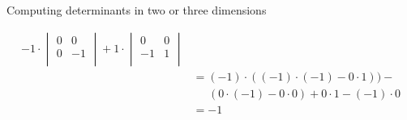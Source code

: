 \documentclass[notes]{beamer}
\begin{document}
\begin{frame}{Computing determinants in two or three dimensions}
{\begin{align}
       -
       1 \cdot
       \begin{vmatrix}
        0 & 0  \\
        0 & -1 \\
       \end{vmatrix}  
      +
       1 \cdot
       \begin{vmatrix}
        0 & 0  \\
        -1 & 1  \\
       \end{vmatrix}  \\
       &= (-1) \cdot ((-1) \cdot (-1) - 0 \cdot 1)) - \\
       &\;\;\;\;\;  (0 \cdot (-1) - 0 \cdot 0) + 0 \cdot 1 -(-1) \cdot 0 \\
       &= -1
      \end{align}

    }
    \end{frame}
\end{document}
